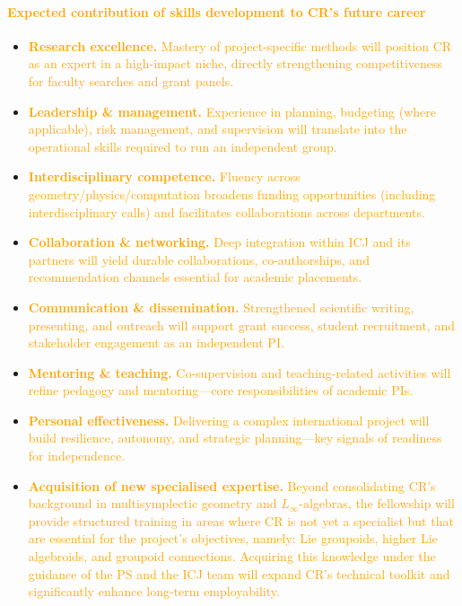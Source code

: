 \documentclass[11pt,draftproposal]{msca-pf}
\begin{document}
\paragraph*{\textcolor{orange}{Expected contribution of skills development to CR’s future career}}
\begin{itemize}[noitemsep,topsep=2pt]
  \item \textcolor{orange}{\textbf{Research excellence.} Mastery of project-specific methods will position CR as an expert in a high-impact niche, directly strengthening competitiveness for faculty searches and grant panels.}
  \item \textcolor{orange}{\textbf{Leadership \& management.} Experience in planning, budgeting (where applicable), risk management, and supervision will translate into the operational skills required to run an independent group.}
  \item \textcolor{orange}{\textbf{Interdisciplinary competence.} Fluency across geometry/physics/computation broadens funding opportunities (including interdisciplinary calls) and facilitates collaborations across departments.}
  \item \textcolor{orange}{\textbf{Collaboration \& networking.} Deep integration within ICJ and its partners will yield durable collaborations, co-authorships, and recommendation channels essential for academic placements.}
  \item \textcolor{orange}{\textbf{Communication \& dissemination.} Strengthened scientific writing, presenting, and outreach will support grant success, student recruitment, and stakeholder engagement as an independent PI.}
  \item \textcolor{orange}{\textbf{Mentoring \& teaching.} Co-supervision and teaching-related activities will refine pedagogy and mentoring—core responsibilities of academic PIs.}
  \item \textcolor{orange}{\textbf{Personal effectiveness.} Delivering a complex international project will build resilience, autonomy, and strategic planning—key signals of readiness for independence.}
  \item \textcolor{orange}{\textbf{Acquisition of new specialised expertise.} Beyond consolidating CR’s background in multisymplectic geometry and $L_\infty$-algebras, the fellowship will provide structured training in areas where CR is not yet a specialist but that are essential for the project’s objectives, namely: Lie groupoids, higher Lie algebroids, and groupoid connections. Acquiring this knowledge under the guidance of the PS and the ICJ team will expand CR’s technical toolkit and significantly enhance long-term employability.}

\end{itemize}
\end{document}
